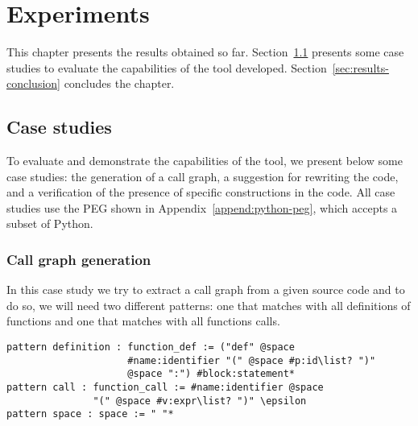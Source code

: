 \chapter{Experiments}\label{chap:results}

This chapter presents the results obtained so far. Section~\ref{sec:case-studies}
presents some case studies to evaluate the capabilities of the tool developed.
Section~\ref{sec:results-conclusion} concludes the chapter.

\section{Case studies}\label{sec:case-studies}

To evaluate and demonstrate the capabilities of the tool, we present below
some case studies: the generation of a call graph, a suggestion for rewriting
the code, and a verification of the presence of specific constructions in the
code. All case studies use the PEG shown in Appendix~\ref{append:python-peg},
which accepts a subset of Python.

\subsection{Call graph generation}

In this case study we try to extract a call graph from a given source code
and to do so, we will need two different patterns: one that matches with all
definitions of functions and one that matches with all functions calls.

\begin{verbatim}
pattern definition : function_def := ("def" @space
                     #name:identifier "(" @space #p:id\list? ")"
                     @space ":") #block:statement*
pattern call : function_call := #name:identifier @space
               "(" @space #v:expr\list? ")" \epsilon
pattern space : space := " "*
\end{verbatim}

